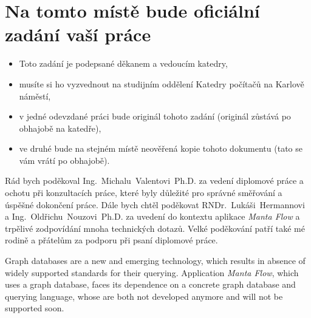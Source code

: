 \documentclass[11pt,twoside,a4paper]{book}
\begin{document}
	\translate				%

	{
	 \cleardoublepage \thispagestyle{empty}
	\chapter*{Na tomto místě bude oficiální zadání vaší práce}
	\begin{itemize}
		\item Toto zadání je podepsané děkanem a vedoucím katedry,
		\item musíte si ho vyzvednout na studijním oddělení Katedry počítačů na Karlově náměstí,
		\item v jedné odevzdané práci bude originál tohoto zadání (originál zůstává po obhajobě na katedře),
		\item ve druhé bude na stejném místě neověřená kopie tohoto dokumentu (tato se vám vrátí po obhajobě).
	\end{itemize}
	\newpage
	}

	\coverpagestarts


	\acknowledgements
	\noindent
   Rád bych poděkoval Ing.~Michalu~Valentovi~Ph.D. za vedení diplomové práce a ochotu při konzultacích
   práce, které byly důležité pro správné směřování a úspěšné dokončení práce. Dále bych chtěl poděkovat
   RNDr.~Lukáši~Hermannovi a Ing.~Oldřichu~Nouzovi~Ph.D. za uvedení do kontextu aplikace \textit{Manta Flow} a trpělivé
   zodpovídání mnoha technických dotazů. Velké poděkování patří také mé rodině a přátelům
   za podporu při psaní diplomové práce.




	\abstractpage

   Graph databases are a new and emerging technology, which results in absence of widely supported standards for their querying. Application \textit{Manta Flow}, which uses a graph database, faces its dependence on a concrete graph database and querying language, whose are both not developed anymore and will not be supported soon.
\end{document}
